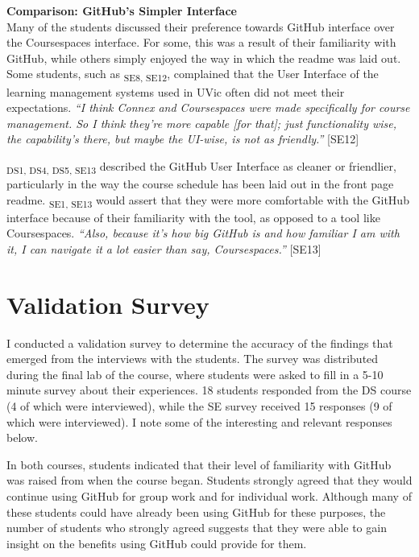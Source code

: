 \textbf{Comparison: GitHub's Simpler Interface} \\
Many of the students discussed their preference towards GitHub interface over the Coursespaces interface. For some, this was a result of their familiarity with GitHub, while others simply enjoyed the way in which the readme was laid out. Some students, such as \textsubscript{SE8, SE12}, complained that the User Interface of the learning management systems used in UVic often did not meet their expectations. \textit{``I think Connex and Coursespaces were made specifically for course management. So I think they're more capable [for that]; just functionality wise, the capability's there, but maybe the UI-wise, is not as friendly.''} [SE12]

\textsubscript{DS1, DS4, DS5, SE13} described the GitHub User Interface as cleaner or friendlier, particularly in the way the course schedule has been laid out in the front page readme. \textsubscript{SE1, SE13} would assert that they were more comfortable with the GitHub interface because of their familiarity with the tool, as opposed to a tool like Coursespaces. \textit{``Also, because it's how big GitHub is and how familiar I am with it, I can navigate it a lot easier than say, Coursespaces.''} [SE13]


\section{Validation Survey}
I conducted a validation survey to determine the accuracy of the findings that emerged from the interviews with the students. The survey was distributed during the final lab of the course, where students were asked to fill in a 5-10 minute survey about their experiences. 18 students responded from the DS course (4 of which were interviewed), while the SE survey received 15 responses (9 of which were interviewed). I note some of the interesting and relevant responses below.

In both courses, students indicated that their level of familiarity with GitHub was raised from when the course began. Students strongly agreed that they would continue using GitHub for group work and for individual work. Although many of these students could have already been using GitHub for these purposes, the number of students who strongly agreed suggests that they were able to gain insight on the benefits using GitHub could provide for them.


